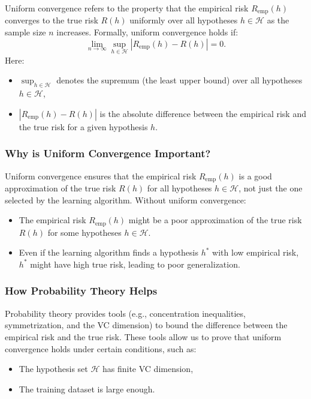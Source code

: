 \begin{notechapter}
Uniform convergence refers to the property that the empirical risk \( R_{\text{emp}}(h) \) converges to the true risk \( R(h) \) uniformly over all hypotheses \( h \in \mathcal{H} \) as the sample size \( n \) increases. Formally, uniform convergence holds if:
\[
\lim_{n \to \infty} \sup_{h \in \mathcal{H}} |R_{\text{emp}}(h) - R(h)| = 0.
\]
Here:
\begin{itemize}
    \item \( \sup_{h \in \mathcal{H}} \) denotes the supremum (the least upper bound) over all hypotheses \( h \in \mathcal{H} \),
    \item \( |R_{\text{emp}}(h) - R(h)| \) is the absolute difference between the empirical risk and the true risk for a given hypothesis \( h \).
\end{itemize}

\subsubsection{Why is Uniform Convergence Important?}

Uniform convergence ensures that the empirical risk \( R_{\text{emp}}(h) \) is a good approximation of the true risk \( R(h) \) for all hypotheses \( h \in \mathcal{H} \), not just the one selected by the learning algorithm. Without uniform convergence:
\begin{itemize}
    \item The empirical risk \( R_{\text{emp}}(h) \) might be a poor approximation of the true risk \( R(h) \) for some hypotheses \( h \in \mathcal{H} \).
    \item Even if the learning algorithm finds a hypothesis \( h^* \) with low empirical risk, \( h^* \) might have high true risk, leading to poor generalization.
\end{itemize}

\subsubsection{How Probability Theory Helps}

Probability theory provides tools (e.g., concentration inequalities, symmetrization, and the VC dimension) to bound the difference between the empirical risk and the true risk. These tools allow us to prove that uniform convergence holds under certain conditions, such as:
\begin{itemize}
    \item The hypothesis set \( \mathcal{H} \) has finite VC dimension,
    \item The training dataset is large enough.
\end{itemize}


\end{notechapter}
